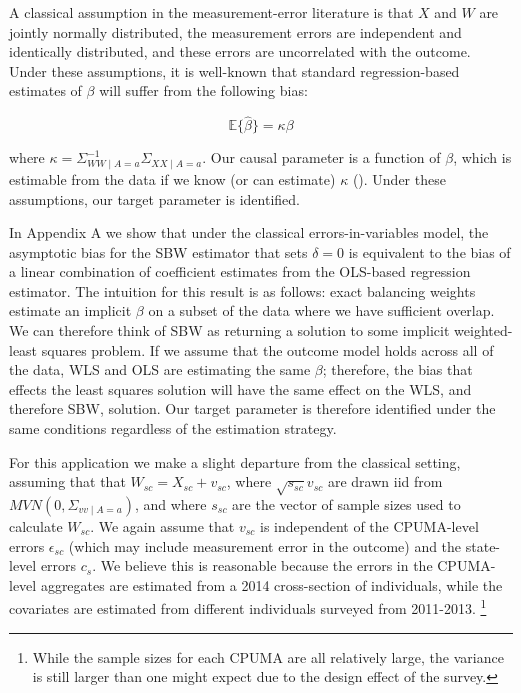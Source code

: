 \documentclass[aoas]{imsart}
\theoremstyle{plain}
\theoremstyle{remark}
\begin{document}
A classical assumption in the measurement-error literature is that $X$ and $W$ are jointly normally distributed, the measurement errors are independent and identically distributed, and these errors are uncorrelated with the outcome. Under these assumptions, it is well-known that standard regression-based estimates of $\beta$ will suffer from the following bias:

$$
\mathbb{E}\{\hat{\beta}\} = \kappa \beta
$$

where $\kappa = \Sigma_{WW \mid A = a}^{-1}\Sigma_{XX \mid A = a}$. Our causal parameter is a function of $\beta$, which is estimable from the data if we know (or can estimate) $\kappa$ (\cite{gleser1992importance}). Under these assumptions, our target parameter is identified.

In Appendix A we show that under the classical errors-in-variables model, the asymptotic bias for the SBW estimator that sets $\delta = 0$ is equivalent to the bias of a linear combination of coefficient estimates from the OLS-based regression estimator. The intuition for this result is as follows: exact balancing weights estimate an implicit $\beta$ on a subset of the data where we have sufficient overlap. We can therefore think of SBW as returning a solution to some implicit weighted-least squares problem. If we assume that the outcome model holds across all of the data, WLS and OLS are estimating the same $\beta$; therefore, the bias that effects the least squares solution will have the same effect on the WLS, and therefore SBW, solution. Our target parameter is therefore identified under the same conditions regardless of the estimation strategy.

For this application we make a slight departure from the classical setting, assuming that that $W_{sc} = X_{sc} + v_{sc}$, where $\sqrt{s_{sc}}v_{sc}$ are drawn iid from $MVN(0, \Sigma_{vv \mid A = a})$, and where $s_{sc}$ are the vector of sample sizes used to calculate $W_{sc}$. We again assume that $v_{sc}$ is independent of the CPUMA-level errors $\epsilon_{sc}$ (which may include measurement error in the outcome) and the state-level errors $c_s$. We believe this is reasonable because the errors in the CPUMA-level aggregates are estimated from a 2014 cross-section of individuals, while the covariates are estimated from different individuals surveyed from 2011-2013. \footnote{While the sample sizes for each CPUMA are all relatively large, the variance is still larger than one might expect due to the design effect of the survey.} 
\end{document}
